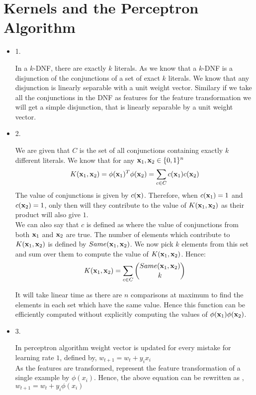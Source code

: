 \documentclass[12pt]{exam}
\newcommand{\bx}{{\bf x}}
\begin{document}
\section{Kernels and the Perceptron Algorithm}
\begin{itemize}
\item[] 1.
\begin{solution}
In a $k$-DNF, there are exactly $k$ literals. As we know that a $k$-DNF is a disjunction  of the conjunctions of a set of exact $k$ literals. We know that any disjunction is linearly separable with a unit weight vector. Similary if we take all the conjunctions in the DNF as features for the feature transformation we will get a simple disjunction, that is linearly separable by a unit weight vector.
\end{solution}
\item[] 2.
\begin{solution}
We are given that $C$ is the set of all conjunctions containing exactly $k$ different literals. We know that for any $\bx_1, \bx_2 \in \{0, 1\}^n$
$$K(\bx_1, \bx_2) = \phi(\bx_1)^T\phi(\bx_2) = \sum_{c \in C} c(\bx_1)c(\bx_2)$$ 
The value of conjunctions is given by $c(\bx)$. Therefore, when $c(\bx_1) =1$ and $c(\bx_2) = 1$, only then will they contribute to the value of $K(\bx_1, \bx_2) $ as their product will also give $1$. \\
We can also say that $c$ is defined as where the value of conjunctions from both $\bx_1$ and $\bx_2$ are true. The number of elements which contribute to $K(\bx_1, \bx_2)$ is defined by $Same(\bx_1,\bx_2)$. We now pick $k$ elements from this set and sum over them to compute the value of $K(\bx_1, \bx_2)$. Hence:
  \[ K(\bx_1, \bx_2) = \sum_{c \in C} \binom {Same(\bx_1,\bx_2)} {k}  \]

It will take linear time as there are $n$ comparisons at maximum to find the elements in each set which have the same value. Hence this function can be efficiently computed without explicitly computing the values of $\phi(\bx_1)\phi(\bx_2)$.
\end{solution}

\item[] 3.
\begin{solution}
In perceptron algorithm weight vector is updated for every mistake for learning rate $1$, defined by, $w_{t+1} = w_t + y_i x_i$\\
  
As the features are transformed, represent the feature transformation of a single example by $\phi(x_i)$. Hence, the above equation can be rewritten as , $w_{t+1} = w_t + y_i\phi(x_i)$\\
  

\end{solution}
\end{itemize}
\end{document}
